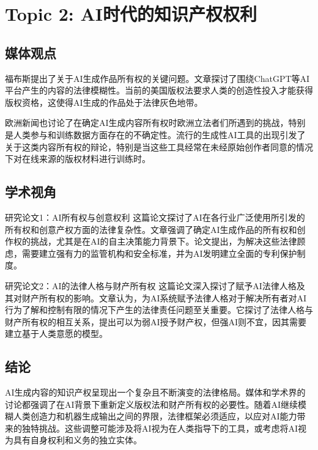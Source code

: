 \documentclass[11pt]{article}
\begin{document}
\section{Topic 2: AI时代的知识产权权利}

\subsection{媒体观点}

福布斯提出了关于AI生成作品所有权的关键问题。文章探讨了围绕ChatGPT等AI平台产生的内容的法律模糊性。当前的美国版权法要求人类的创造性投入才能获得版权资格，这使得AI生成的作品处于法律灰色地带。

欧洲新闻也讨论了在确定AI生成内容所有权时欧洲立法者们所遇到的挑战，特别是人类参与和训练数据方面存在的不确定性。流行的生成性AI工具的出现引发了关于这类内容所有权的辩论，特别是当这些工具经常在未经原始创作者同意的情况下对在线来源的版权材料进行训练时。

\subsection{学术视角}

研究论文1：AI所有权与创意权利
这篇论文探讨了AI在各行业广泛使用所引发的所有权和创意产权方面的法律复杂性。文章强调了确定AI生成作品的所有权和创作权的挑战，尤其是在AI的自主决策能力背景下。论文提出，为解决这些法律顾虑，需要建立强有力的监管机构和安全标准，并为AI发明建立全面的专利保护制度。

研究论文2：AI的法律人格与财产所有权
这篇论文深入探讨了赋予AI法律人格及其对财产所有权的影响。文章认为，为AI系统赋予法律人格对于解决所有者对AI行为了解和控制有限的情况下产生的法律责任问题至关重要。它探讨了法律人格与财产所有权的相互关系，提出可以为弱AI授予财产权，但强AI则不宜，因其需要建立基于人类意愿的模型。

\subsection{结论}
AI生成内容的知识产权呈现出一个复杂且不断演变的法律格局。媒体和学术界的讨论都强调了在AI背景下重新定义版权法和财产所有权的必要性。随着AI继续模糊人类创造力和机器生成输出之间的界限，法律框架必须适应，以应对AI能力带来的独特挑战。这些调整可能涉及将AI视为在人类指导下的工具，或考虑将AI视为具有自身权利和义务的独立实体。
\end{document}
